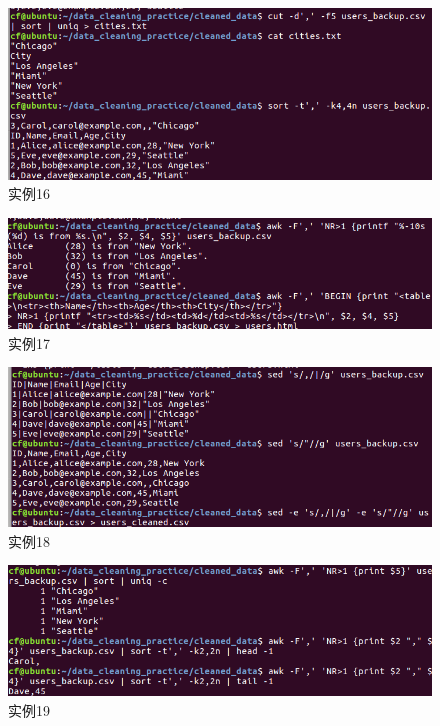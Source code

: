 \documentclass[cn,12pt]{report}
\begin{document}
      \begin{figure}[htbp]
    \centering
    \includegraphics[width=1\textwidth]{image/16.png}
    \caption{实例16}
  \end{figure}

    \begin{figure}[htbp]
    \centering
    \includegraphics[width=1\textwidth]{image/17.png}
    \caption{实例17}
  \end{figure}

      \begin{figure}[htbp]
    \centering
    \includegraphics[width=1\textwidth]{image/18.png}
    \caption{实例18}
  \end{figure}

      \begin{figure}[htbp]
    \centering
    \includegraphics[width=1\textwidth]{image/19.png}
    \caption{实例19}
  \end{figure}
\end{document}
